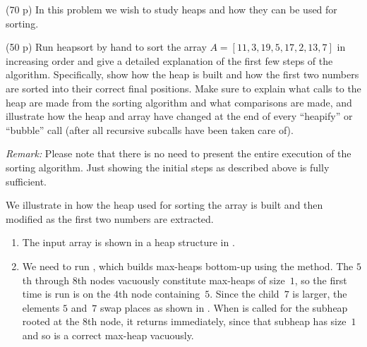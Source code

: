 \documentclass{jn-pset}
\begin{document}
\begin{problem}
  (70 p)
  In this problem we wish to study heaps and how they can be used for sorting.

\begin{subproblem}%
  \label{problem:heap-sort}%
  {(50 p)}
  {\ignorespaces}
  Run heapsort by hand to sort the array
  $
  A =
  [ 11, 3, 19, 5, 17, 2, 13, 7 ]
  $
  in increasing order
  and give a detailed explanation of the first few steps of the
  algorithm.
  Specifically,
  show how the
  heap is built and how the first two numbers
  are sorted into their correct final positions.
  Make sure to explain what calls to the heap are made from the
  sorting algorithm and what comparisons are made, 
  and illustrate how the heap and array have changed at the
  end of every ``heapify'' or ``bubble'' call (after all recursive
  subcalls have been taken  care of).

  \smallskip
  \noindent
  \emph{Remark:}
  Please note that
  there is no need to
  present the entire execution of the sorting algorithm.
  Just showing the initial steps
  as described above is fully sufficient.
\end{subproblem}

\begin{solution}
  We illustrate in
  how the heap used for sorting the array is built
  and then modified as the first two numbers are extracted.
%
  \begin{enumerate}
  \item 
    The input array is shown in a heap structure in
    .
    
      
    
  \item 
    We need to run \buildmaxheap, which builds max-heaps bottom-up
    using the \maxheapify method. The $5$th through $8$th nodes
    vacuously constitute max-heaps of size~$1$, so the first time
    \maxheapify is run is on the $4$th node containing~$5$.
    Since the child~$7$ is larger, the elements
    $5$ and~$7$ swap places as shown in
    .
    When \maxheapify is called for the subheap rooted at the $8$th
    node, it returns immediately, since that subheap has size~$1$
    and so is a correct max-heap vacuously. 


\end{enumerate}
\end{solution}
\end{problem}
\end{document}
